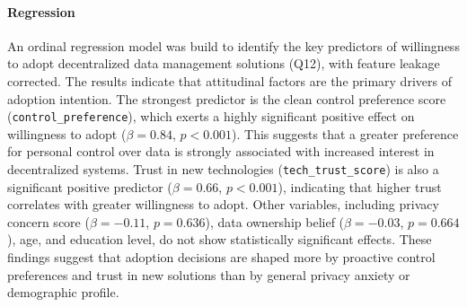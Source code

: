 	\paragraph{Regression}
	An ordinal regression model was build to identify the key predictors of willingness to adopt decentralized data management solutions (Q12),	with feature leakage corrected. The results indicate that attitudinal factors are the primary drivers of adoption intention.
	The strongest predictor is the clean control preference score (\texttt{control\_preference}), which exerts a highly significant positive effect on willingness to adopt ($\beta = 0.84$, $p < 0.001$). This suggests that a greater preference for personal control over data is strongly associated with increased interest in decentralized systems. Trust in new technologies (\texttt{tech\_trust\_score}) is also a significant positive predictor ($\beta = 0.66$, $p < 0.001$), indicating that higher trust correlates with greater willingness to adopt.
	Other variables, including privacy concern score ($\beta = -0.11$, $p = 0.636$), data ownership belief ($\beta = -0.03$, $p = 0.664$), age, and education level, do not show statistically significant effects. These findings suggest that adoption decisions are shaped more by proactive control preferences and trust in new solutions than by general privacy anxiety or demographic profile.
